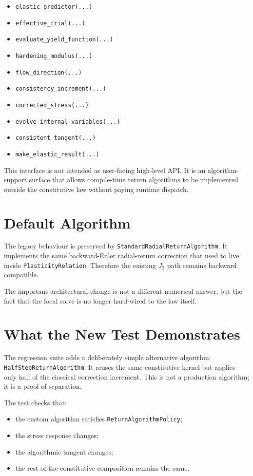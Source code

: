 \begin{itemize}
  \item \texttt{elastic\_predictor(...)}
  \item \texttt{effective\_trial(...)}
  \item \texttt{evaluate\_yield\_function(...)}
  \item \texttt{hardening\_modulus(...)}
  \item \texttt{flow\_direction(...)}
  \item \texttt{consistency\_increment(...)}
  \item \texttt{corrected\_stress(...)}
  \item \texttt{evolve\_internal\_variables(...)}
  \item \texttt{consistent\_tangent(...)}
  \item \texttt{make\_elastic\_result(...)}
\end{itemize}

This interface is not intended as user-facing high-level API.  It is an
algorithm-support surface that allows compile-time return algorithms to be
implemented outside the constitutive law without paying runtime dispatch.

\section{Default Algorithm}

The legacy behaviour is preserved by
\texttt{StandardRadialReturnAlgorithm}.  It implements the same backward-Euler
radial-return correction that used to live inside
\texttt{PlasticityRelation}.  Therefore the existing \(J_2\) path remains
backward compatible.

The important architectural change is not a different numerical answer, but the
fact that the local solve is no longer hard-wired to the law itself.

\section{What the New Test Demonstrates}

The regression suite adds a deliberately simple alternative algorithm:
\texttt{HalfStepReturnAlgorithm}.  It reuses the same constitutive kernel but
applies only half of the classical correction increment.  This is not a
production algorithm; it is a proof of separation.

The test checks that:

\begin{itemize}
  \item the custom algorithm satisfies \texttt{ReturnAlgorithmPolicy};
  \item the stress response changes;
  \item the algorithmic tangent changes;
  \item the rest of the constitutive composition remains the same.
\end{itemize}

